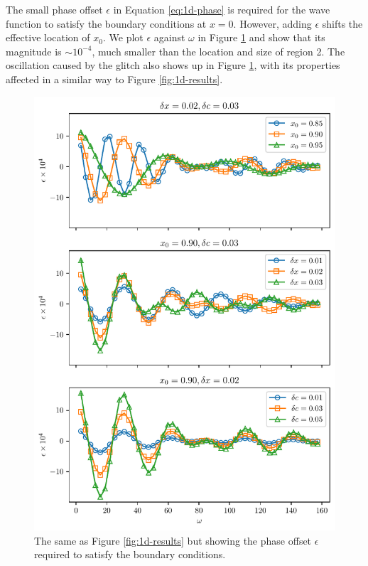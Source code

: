 The small phase offset \(\epsilon\) in Equation \ref{eq:1d-phase} is required for the wave function to satisfy the boundary conditions at \(x = 0\). However, adding \(\epsilon\) shifts the effective location of \(x_0\). We plot \(\epsilon\) against \(\omega\) in Figure \ref{fig:1d-phase} and show that its magnitude is \(\sim 10^{-4}\), much smaller than the location and size of region 2. The oscillation caused by the glitch also shows up in Figure \ref{fig:1d-phase}, with its properties affected in a similar way to Figure \ref{fig:1d-results}.

\begin{figure}
    \centering
    \includegraphics{figures/glitch-1d-example-phase.pdf}
    \caption{The same as Figure \ref{fig:1d-results} but showing the phase offset \(\epsilon\) required to satisfy the boundary conditions.}
    \label{fig:1d-phase}
\end{figure}

